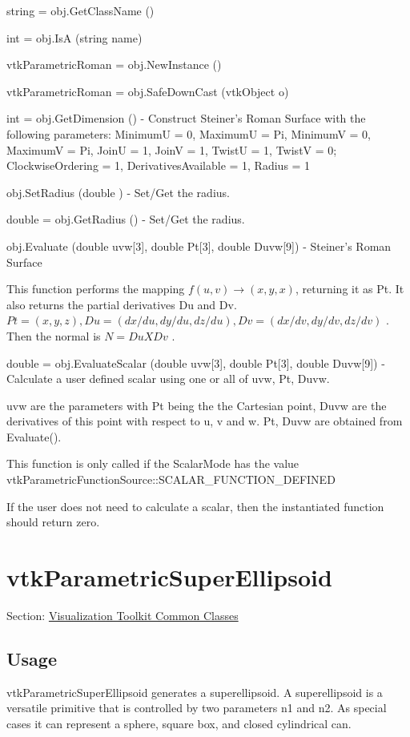 \begin{DoxyItemize}
\item {\ttfamily string = obj.\-Get\-Class\-Name ()}  
\item {\ttfamily int = obj.\-Is\-A (string name)}  
\item {\ttfamily vtk\-Parametric\-Roman = obj.\-New\-Instance ()}  
\item {\ttfamily vtk\-Parametric\-Roman = obj.\-Safe\-Down\-Cast (vtk\-Object o)}  
\item {\ttfamily int = obj.\-Get\-Dimension ()} -\/ Construct Steiner's Roman Surface with the following parameters\-: Minimum\-U = 0, Maximum\-U = Pi, Minimum\-V = 0, Maximum\-V = Pi, Join\-U = 1, Join\-V = 1, Twist\-U = 1, Twist\-V = 0; Clockwise\-Ordering = 1, Derivatives\-Available = 1, Radius = 1  
\item {\ttfamily obj.\-Set\-Radius (double )} -\/ Set/\-Get the radius.  
\item {\ttfamily double = obj.\-Get\-Radius ()} -\/ Set/\-Get the radius.  
\item {\ttfamily obj.\-Evaluate (double uvw\mbox{[}3\mbox{]}, double Pt\mbox{[}3\mbox{]}, double Duvw\mbox{[}9\mbox{]})} -\/ Steiner's Roman Surface

This function performs the mapping $f(u,v) \rightarrow (x,y,x)$, returning it as Pt. It also returns the partial derivatives Du and Dv. $Pt = (x, y, z), Du = (dx/du, dy/du, dz/du), Dv = (dx/dv, dy/dv, dz/dv)$ . Then the normal is $N = Du X Dv$ .  
\item {\ttfamily double = obj.\-Evaluate\-Scalar (double uvw\mbox{[}3\mbox{]}, double Pt\mbox{[}3\mbox{]}, double Duvw\mbox{[}9\mbox{]})} -\/ Calculate a user defined scalar using one or all of uvw, Pt, Duvw.

uvw are the parameters with Pt being the the Cartesian point, Duvw are the derivatives of this point with respect to u, v and w. Pt, Duvw are obtained from Evaluate().

This function is only called if the Scalar\-Mode has the value vtk\-Parametric\-Function\-Source\-::\-S\-C\-A\-L\-A\-R\-\_\-\-F\-U\-N\-C\-T\-I\-O\-N\-\_\-\-D\-E\-F\-I\-N\-E\-D

If the user does not need to calculate a scalar, then the instantiated function should return zero.


\end{DoxyItemize}\hypertarget{vtkcommon_vtkparametricsuperellipsoid}{}\section{vtk\-Parametric\-Super\-Ellipsoid}\label{vtkcommon_vtkparametricsuperellipsoid}
Section\-: \hyperlink{sec_vtkcommon}{Visualization Toolkit Common Classes} \hypertarget{vtkwidgets_vtkxyplotwidget_Usage}{}\subsection{Usage}\label{vtkwidgets_vtkxyplotwidget_Usage}
vtk\-Parametric\-Super\-Ellipsoid generates a superellipsoid. A superellipsoid is a versatile primitive that is controlled by two parameters n1 and n2. As special cases it can represent a sphere, square box, and closed cylindrical can.


